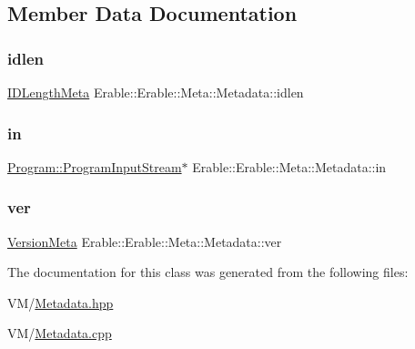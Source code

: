 \subsection{Member Data Documentation}
\mbox{\label{class_erable_1_1_erable_1_1_meta_1_1_metadata_a4cbb333222343f1b01dfff65b5a91b4c}} 
\subsubsection{\texorpdfstring{idlen}{idlen}}
{\footnotesize\ttfamily \mbox{\hyperlink{struct_erable_1_1_erable_1_1_meta_1_1_i_d_length_meta}{I\+D\+Length\+Meta}} Erable\+::\+Erable\+::\+Meta\+::\+Metadata\+::idlen\hspace{0.3cm}{\ttfamily [private]}}

\mbox{\label{class_erable_1_1_erable_1_1_meta_1_1_metadata_a8b9de1048f3739f22de3e00644ef5931}} 
\subsubsection{\texorpdfstring{in}{in}}
{\footnotesize\ttfamily \mbox{\hyperlink{class_erable_1_1_erable_1_1_program_1_1_program_input_stream}{Program\+::\+Program\+Input\+Stream}}$\ast$ Erable\+::\+Erable\+::\+Meta\+::\+Metadata\+::in\hspace{0.3cm}{\ttfamily [private]}}

\mbox{\label{class_erable_1_1_erable_1_1_meta_1_1_metadata_adbf922c4cac970605f38dae0c10c3f2e}} 
\subsubsection{\texorpdfstring{ver}{ver}}
{\footnotesize\ttfamily \mbox{\hyperlink{struct_erable_1_1_erable_1_1_meta_1_1_version_meta}{Version\+Meta}} Erable\+::\+Erable\+::\+Meta\+::\+Metadata\+::ver\hspace{0.3cm}{\ttfamily [private]}}



The documentation for this class was generated from the following files\+:\begin{DoxyCompactItemize}
\item 
V\+M/\mbox{\hyperlink{_metadata_8hpp}{Metadata.\+hpp}}\item 
V\+M/\mbox{\hyperlink{_metadata_8cpp}{Metadata.\+cpp}}\end{DoxyCompactItemize}

